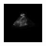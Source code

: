 \begin{figure}[htb]
\begin{subfigure}[b]{0.245\textwidth}
        \end{subfigure}%
        \begin{subfigure}[b]{0.245\textwidth}
                \centering
                \includegraphics[width=\linewidth]{img_seg/37_post}
        \end{subfigure}
        

\end{figure}
